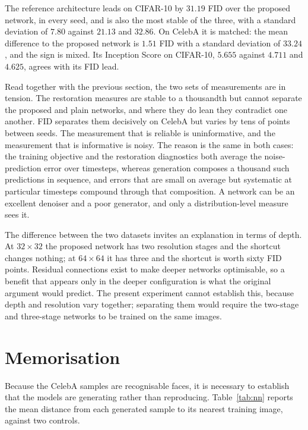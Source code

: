 The reference architecture leads on CIFAR-10 by $31.19$ FID over the proposed network, in every
seed, and is also the most stable of the three, with a standard deviation of $7.80$ against $21.13$
and $32.86$. On CelebA it is matched: the mean difference to the proposed network is $1.51$ FID with
a standard deviation of $33.24$, and the sign is mixed. Its Inception Score on CIFAR-10, $5.655$
against $4.711$ and $4.625$, agrees with its FID lead.

Read together with the previous section, the two sets of measurements are in tension. The
restoration measures are stable to a thousandth but cannot separate the proposed and plain networks,
and where they do lean they contradict one another. FID separates them decisively on CelebA but
varies by tens of points between seeds. The measurement that is reliable is uninformative, and the
measurement that is informative is noisy. The reason is the same in both cases: the training
objective and the restoration diagnostics both average the noise-prediction error over timesteps,
whereas generation composes a thousand such predictions in sequence, and errors that are small on
average but systematic at particular timesteps compound through that composition. A network can be
an excellent denoiser and a poor generator, and only a distribution-level measure sees it.

The difference between the two datasets invites an explanation in terms of depth. At $32 \times 32$
the proposed network has two resolution stages and the shortcut changes nothing; at $64 \times 64$
it has three and the shortcut is worth sixty FID points. Residual connections exist to make deeper
networks optimisable, so a benefit that appears only in the deeper configuration is what the
original argument would predict. The present experiment cannot establish this, because depth and
resolution vary together; separating them would require the two-stage and three-stage networks to be
trained on the same images.

\section{Memorisation}

Because the CelebA samples are recognisable faces, it is necessary to establish that the models are
generating rather than reproducing. Table~\ref{tab:nn} reports the mean distance from each generated
sample to its nearest training image, against two controls.


